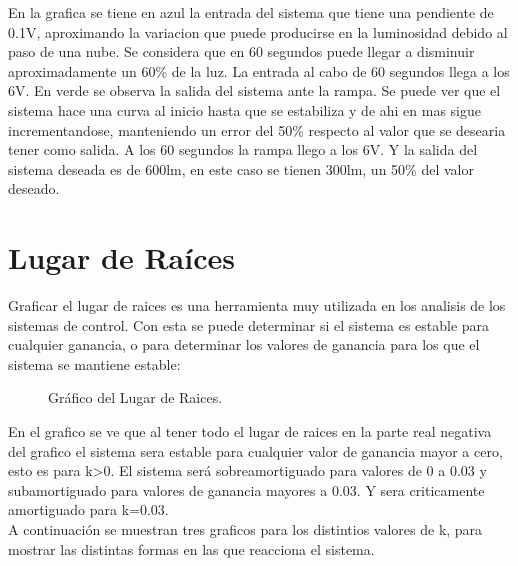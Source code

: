 \documentclass[a4paper,11pt]{article}
\begin{document}
En la grafica se tiene en azul la entrada del sistema que tiene una pendiente de 0.1V, aproximando la variacion que puede producirse en la luminosidad debido al paso de una nube. Se considera que en 60 segundos puede llegar a disminuir aproximadamente un 60\% de la luz. La entrada al cabo de 60 segundos llega a los 6V.
En verde se observa la salida del sistema ante la rampa. Se puede ver que el sistema hace una curva al inicio hasta que se estabiliza y de ahi en mas sigue incrementandose, manteniendo un error del 50\% respecto al valor que se desearia tener como salida. A los 60 segundos la rampa llego a los 6V. Y la salida del sistema deseada es de 600lm, en este caso se tienen 300lm, un 50\% del valor deseado.

\section{Lugar de Raíces}

Graficar el lugar de raices es una herramienta muy utilizada en los analisis de los sistemas de control. Con esta se puede determinar si el sistema es estable para cualquier ganancia, o para determinar los valores de ganancia para los que el sistema se mantiene estable:

  \begin{figure}[H] %
	\caption{Gráfico del Lugar de Raices.}
	\label{fig:LR1}
	\end{figure} 

En el grafico se ve que al tener todo el lugar de raices en la parte real negativa del grafico el sistema sera estable para cualquier valor de ganancia mayor a cero, esto es para k>0.
El sistema será sobreamortiguado para valores de 0 a 0.03 y subamortiguado para valores de ganancia mayores a 0.03. Y sera criticamente amortiguado para k=0.03.\\
A continuación se muestran tres graficos para los distintios valores de k, para mostrar las distintas formas en las que reacciona el sistema.
\end{document}
